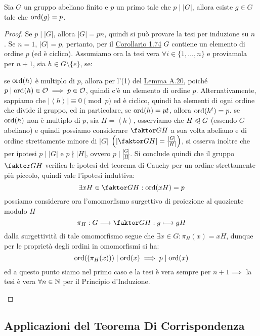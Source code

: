 \documentclass[11pt]{scrartcl}
\begin{document}
\begin{theorem}
Sia $G$ un gruppo abeliano finito e $p$ un primo tale che $p \mid |G|$, allora esiste $g \in G$ tale che $\operatorname{ord}(g) = p$.
\end{theorem}

\begin{proof}
Se $p \mid |G|$, allora $|G| = pn$, quindi si può provare la tesi per induzione su $n$ . Se $n =1$, $|G| = p$, pertanto, per il \hyperref[g:Gp]{Corollario 1.74} $G$ contiene un elemento di ordine $p$ (ed è ciclico). Assumiamo ora la tesi vera $\forall i \in \{1,\ldots,n\}$ e proviamola per $n+1$, sia $h \in G\setminus\{e\}$, se:
	\begin{itemize}
	\ii se $\operatorname{ord}(h)$ è multiplo di $p$, allora per l'(1) del \hyperref[A.20]{Lemma A.20}, poiché $p \mid \operatorname{ord}(h) \in \mathcal O \implies p \in \mathcal O$, 
	quindi c'è un elemento di ordine $p$. Alternativamente, sappiamo che $|\left<h\right>| \equiv 0 \pmod p$ ed è ciclico, quindi ha elementi di ogni ordine che divide il gruppo,
	ed in particolare, se $\operatorname{ord}(h) = pt$, allora $\operatorname{ord}(h^t) = p$.
	\ii se $\operatorname{ord}(h)$ non è multiplo di $p$, sia $H = \left<h\right>$, osserviamo che $H \trianglelefteqslant G$ (essendo $G$ abeliano) e quindi possiamo 
	considerare $\faktor GH$ a sua volta abeliano e di ordine strettamente minore di $|G|$ $\left( \left|\faktor GH \right| = \frac{|G|}{|H|}\right)$, 
	si osserva inoltre che per ipotesi $p \mid |G|$ e $p \nmid |H|$, ovvero $p \mid  \frac{|G|}{|H|}$. Si conclude quindi che il gruppo $\faktor GH$ 
	verifica le ipotesi del teorema di Cauchy per un ordine strettamente più piccolo, quindi vale l'ipotesi induttiva:
		\[ \exists xH \in \faktor GH : \ord(xH) = p
		\]
	possiamo considerare ora l'omomorfismo surgettivo di proiezione al quoziente modulo $H$
		\[ \pi_H : G \longrightarrow \faktor GH : g \longmapsto gH
		\]
	dalla surgettività di tale omomorfismo segue che $\exists x \in G : \pi_H(x) = xH$, dunque per le proprietà degli ordini in omomorfismi si ha:
		\[ \operatorname{ord}((\pi_H(x))) \mid \operatorname{ord}(x) \implies p \mid \operatorname{ord}(x)
		\]
	ed a questo punto siamo nel primo caso e la tesi è vera sempre per $n+1 \implies$ la tesi è vera $\forall n \in \mathbb N$ per il Principio d'Induzione.
	\end{itemize}
\end{proof}

\newpage
\subsection{Applicazioni del Teorema Di Corrispondenza}
\end{document}
